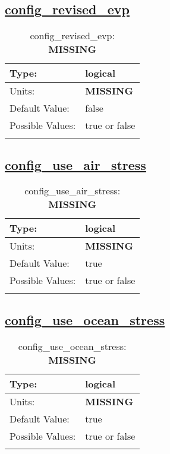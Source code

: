 \subsection[config\_revised\_evp]{\hyperref[sec:nm_tab_velocity_solver]{config\_revised\_evp}}
\label{subsec:nm_sec_config_revised_evp}
\begin{center}
\begin{longtable}{| p{2.0in} || p{4.0in} |}
    \hline
    Type: & logical \\
    \hline
    Units: & {\bf \color{red} MISSING} \\
    \hline
    Default Value: & false \\
    \hline
    Possible Values: & true or false \\
    \hline
    \caption{config\_revised\_evp: {\bf \color{red} MISSING}}
\end{longtable}
\end{center}
\subsection[config\_use\_air\_stress]{\hyperref[sec:nm_tab_velocity_solver]{config\_use\_air\_stress}}
\label{subsec:nm_sec_config_use_air_stress}
\begin{center}
\begin{longtable}{| p{2.0in} || p{4.0in} |}
    \hline
    Type: & logical \\
    \hline
    Units: & {\bf \color{red} MISSING} \\
    \hline
    Default Value: & true \\
    \hline
    Possible Values: & true or false \\
    \hline
    \caption{config\_use\_air\_stress: {\bf \color{red} MISSING}}
\end{longtable}
\end{center}
\subsection[config\_use\_ocean\_stress]{\hyperref[sec:nm_tab_velocity_solver]{config\_use\_ocean\_stress}}
\label{subsec:nm_sec_config_use_ocean_stress}
\begin{center}
\begin{longtable}{| p{2.0in} || p{4.0in} |}
    \hline
    Type: & logical \\
    \hline
    Units: & {\bf \color{red} MISSING} \\
    \hline
    Default Value: & true \\
    \hline
    Possible Values: & true or false \\
    \hline
    \caption{config\_use\_ocean\_stress: {\bf \color{red} MISSING}}
\end{longtable}
\end{center}
